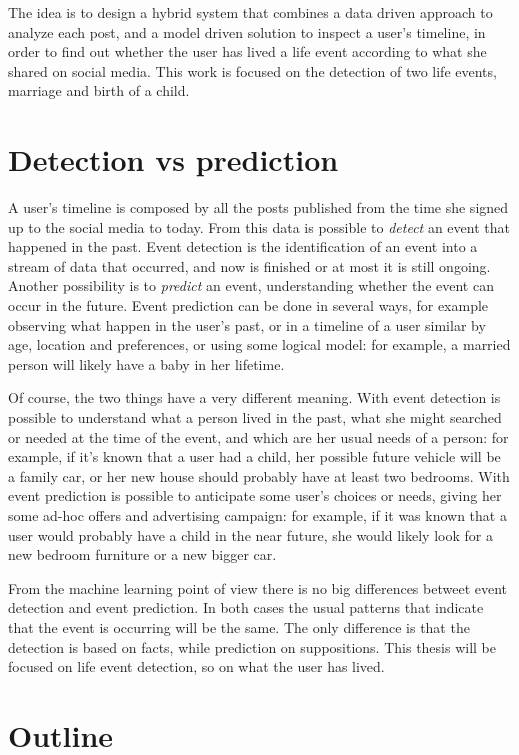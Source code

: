 The idea is to design a hybrid system that combines a data driven approach to analyze each post, and a model driven solution to inspect a user's timeline, in order to find out whether the user has lived a life event according to what she shared on social media. This work is focused on the detection of two life events, marriage and birth of a child.

\section{Detection vs prediction}

A user's timeline is composed by all the posts published from the time she signed up to the social media to today. From this data is possible to \textit{detect} an event that happened in the past. Event detection is the identification of an event into a stream of data that occurred, and now is finished or at most it is still ongoing. Another possibility is to \textit{predict} an event, understanding whether the event can occur in the future. Event prediction can be done in several ways, for example observing what happen in the user's past, or in a timeline of a user similar by age, location and preferences, or using some logical model: for example, a married person will likely have a baby in her lifetime.

Of course, the two things have a very different meaning. With event detection is possible to understand what a person lived in the past, what she might searched or needed at the time of the event, and which are her usual needs of a person: for example, if it's known that a user had a child, her possible future vehicle will be a family car, or her new house should probably have at least two bedrooms. With event prediction is possible to anticipate some user's choices or needs, giving her some ad-hoc offers and advertising campaign: for example, if it was known that a user would probably have a child in the near future, she would likely look for a new bedroom furniture or a new bigger car.

From the machine learning point of view there is no big differences betweet event detection and event prediction. In both cases the usual patterns that indicate that the event is occurring will be the same. The only difference is that the detection is based on facts, while prediction on suppositions. This thesis will be focused on life event detection, so on what the user has lived.

\section{Outline}

